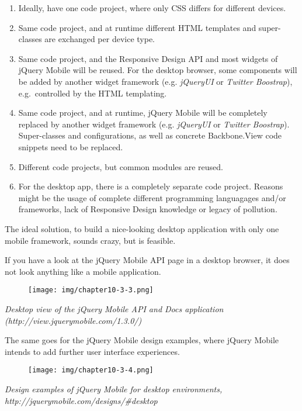 \documentclass[9pt]{book}
\begin{document}
\begin{enumerate}
\def\labelenumi{\arabic{enumi}.}
\itemsep1pt\parskip0pt
\item
  Ideally, have one code project, where only CSS differs for different
  devices.
\item
  Same code project, and at runtime different HTML templates and
  super-classes are exchanged per device type.
\item
  Same code project, and the Responsive Design API and most widgets of
  jQuery Mobile will be reused. For the desktop browser, some components
  will be added by another widget framework (e.g. \emph{jQueryUI} or
  \emph{Twitter Boostrap}), e.g.~controlled by the HTML templating.
\item
  Same code project, and at runtime, jQuery Mobile will be completely
  replaced by another widget framework (e.g. \emph{jQueryUI} or
  \emph{Twitter Boostrap}). Super-classes and configurations, as well as
  concrete Backbone.View code snippets need to be replaced.
\item
  Different code projects, but common modules are reused.
\item
  For the desktop app, there is a completely separate code project.
  Reasons might be the usage of complete different programming
  languagages and/or frameworks, lack of Responsive Design knowledge or
  legacy of pollution.
\end{enumerate}

The ideal solution, to build a nice-looking desktop application with
only one mobile framework, sounds crazy, but is feasible.

If you have a look at the jQuery Mobile API page in a desktop browser,
it does not look anything like a mobile application.

\begin{figure}[htbp]
\centering
\texttt{[image: img/chapter10-3-3.png]}
\end{figure}

\emph{Desktop view of the jQuery Mobile API and Docs application
(http://view.jquerymobile.com/1.3.0/)}

The same goes for the jQuery Mobile design examples, where jQuery Mobile
intends to add further user interface experiences.

\begin{figure}[htbp]
\centering
\texttt{[image: img/chapter10-3-4.png]}
\end{figure}

\emph{Design examples of jQuery Mobile for desktop environments,
http://jquerymobile.com/designs/\#desktop}
\end{document}
